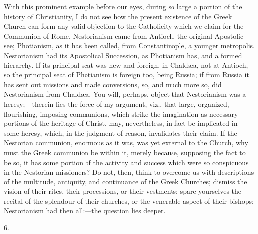With this prominent example before our eyes, during so large a
portion of the history of Christianity, I do not see how the present
existence of the Greek Church can form any valid objection to the
Catholicity which we claim for the Communion of Rome. Nestorianism
came from Antioch, the original Apostolic see; Photianism, as it has
been called, from Constantinople, a younger metropolis. Nestorianism
had its Apostolical Succession, as Photianism has, and a formed
hierarchy. If its principal seat was new and foreign, in Chaldæa, not
at Antioch, so the principal seat of Photianism is foreign too, being
Russia; if from Russia it has sent out missions and made conversions,
so, and much more so, did Nestorianism from Chaldæa. You will,
perhaps, object that Nestorianism was a heresy;—therein lies the
force of my argument, viz., that large, organized, flourishing,
imposing communions, which strike the imagination as necessary
portions of the heritage of Christ, may, nevertheless, in fact be
implicated in some heresy, which, in the judgment of reason,
invalidates their claim. If the Nestorian communion, enormous as it
was, was yet external to the Church, why must the Greek communion be
within it, merely because, supposing the fact to be so, it has some
portion of the activity and success which were so conspicuous in the
Nestorian missioners? Do not, then, think to overcome us with
descriptions of the multitude, antiquity, and continuance of the Greek
Churches; dismiss the vision of their rites, their processions, or
their vestments; spare yourselves the recital of the splendour of
their churches, or the venerable aspect of their bishops; Nestorianism
had then all:—the question lies deeper.

6.


